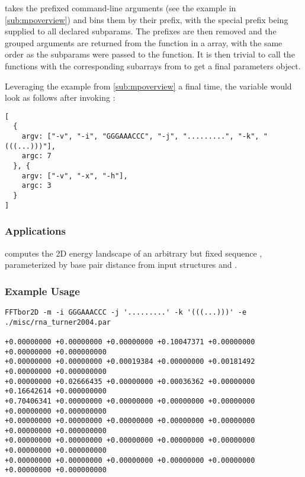 \documentclass[11pt]{article}
\begin{document}
 takes the prefixed command-line arguments (see the example in \ref{sub:mpoverview}) and bins them by their prefix, with the special  prefix being supplied to all declared subparams. The prefixes are then removed and the grouped arguments are returned from the function in a  array, with the same order as the subparams were passed to the function. It is then trivial to call the  functions with the corresponding subarrays from  to get a final parameters object.

Leveraging the example from \ref{sub:mpoverview} a final time, the variable  would look as follows after invoking :
\begin{verbatim}
[
  {
    argv: ["-v", "-i", "GGGAAACCC", "-j", ".........", "-k", "(((...)))"],
    argc: 7
  }, {
    argv: ["-v", "-x", "-h"],
    argc: 3
  }
]
\end{verbatim}



\subsubsection{Applications} \label{subsub:fftborapp}

\fft computes the 2D energy landscape of an arbitrary but fixed sequence \s, parameterized by base pair distance from input structures \A and \B.

\subsubsection{Example Usage} \label{subsub:fftborex}

\begin{verbatim}
FFTbor2D -m -i GGGAAACCC -j '.........' -k '(((...)))' -e ./misc/rna_turner2004.par

+0.00000000	+0.00000000	+0.00000000	+0.10047371	+0.00000000	+0.00000000	+0.000000000
+0.00000000	+0.00000000	+0.00019384	+0.00000000	+0.00181492	+0.00000000	+0.000000000
+0.00000000	+0.02666435	+0.00000000	+0.00036362	+0.00000000	+0.16642614	+0.000000000
+0.70406341	+0.00000000	+0.00000000	+0.00000000	+0.00000000	+0.00000000	+0.000000000
+0.00000000	+0.00000000	+0.00000000	+0.00000000	+0.00000000	+0.00000000	+0.000000000
+0.00000000	+0.00000000	+0.00000000	+0.00000000	+0.00000000	+0.00000000	+0.000000000
+0.00000000	+0.00000000	+0.00000000	+0.00000000	+0.00000000	+0.00000000	+0.000000000
\end{verbatim}
\end{document}
